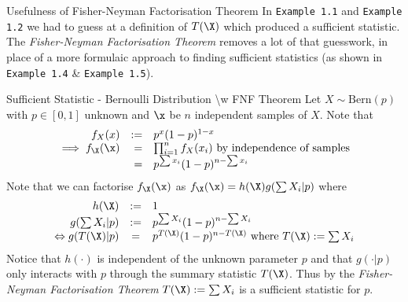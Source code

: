 \documentclass[11pt,a4paper]{article}
\begin{document}
  \begin{remark}{Usefulness of Fisher-Neyman Factorisation Theorem}
    In \texttt{Example 1.1}  and \texttt{Example 1.2} we had to guess at a definition of $T(\X)$ which produced a sufficient statistic. The \textit{Fisher-Neyman Factorisation Theorem} removes a lot of that guesswork, in place of a more formulaic approach to finding sufficient statistics (as shown in \texttt{Example 1.4} \& \texttt{Example 1.5}).
  \end{remark}

  \begin{example}{Sufficient Statistic - Bernoulli Distribution {\textbackslash}w FNF Theorem}
    Let $X\sim\text{Bern}(p)$ with $p\in[0,1]$ unknown and $\x$ be $n$ independent samples of $X$. Note that
    \[\begin{array}{rrl}
      f_X(x)&:=&p^x(1-p)^{1-x}\\
      \implies f_\X(\x)&=&\prod_{i=1}^nf_X(x_i)\text{ by independence of samples}\\
      &=&p^{\sum x_i}(1-p)^{n-\sum x_i}
    \end{array}\]
    Note that we can factorise $f_\X(\x)$ as $f_\X(\x)=h(\X)g(\sum X_i|p)$ where
    \[\begin{array}{rcl}
      h(\X)&:=&1\\
      g(\sum X_i|p)&:=&p^{\sum X_i}(1-p)^{n-\sum X_i}\\
      \Leftrightarrow g(T(\X)|p)&=&p^{T(\X)}(1-p)^{n-T(\X)}\text{ where }T(\X):=\sum X_i
    \end{array}\]
    Notice that $h(\cdot)$ is independent of the unknown parameter $p$ and that $g(\cdot|p)$ only interacts with $p$ through the summary statistic $T(\X)$. Thus by the \textit{Fisher-Neyman Factorisation Theorem} $T(\X):=\sum X_i$ is a sufficient statistic for $p$.
  \end{example}
\end{document}
